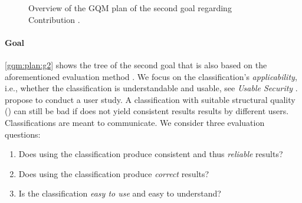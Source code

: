 \newcommand{\textGii}[0]{Validate the classification's \emph{applicability}, whether it is understandable, usable, and yields consistent results when employed by different users.}
\newcommand{\textGiiQi}[0]{Does using the classification produce consistent and thus \emph{reliable} results?}
\newcommand{\textGiiQii}[0]{Does using the classification produce \emph{correct} results?}
\newcommand{\textGiiQiii}[0]{Is the classification \emph{easy to use} and easy to understand?}
\newcommand{\textGiiQiMi}[0]{Relative size of the largest annotator $\emph{consensus} \in [0,1]$}
\newcommand{\textGiiQiiMi}[0]{Correctness of annotators' results, $\recallFormulaFull$}
\newcommand{\textGiiQiiiMi}[0]{\acf{SUS} $\in [0,100]$}
\begin{figure}
    \centering
    \caption{Overview of the \ac*{GQM} plan of the second goal regarding Contribution .}
    \label{gqm:plan:g2}
\end{figure}

\paragraph{Goal }\label{gqm:text:g:2}
\autoref{gqm:plan:g2} shows the tree of the second goal that is also based on the aforementioned evaluation method \cite{kaplan_introducing_2022}.
We focus on the classification's \emph{applicability}, i.e., whether the classification is understandable and usable, see \emph{Usable Security} \cite{sasse_usable_2005}.
\textcite{kaplan_introducing_2022} propose to conduct a user study.
A classification with suitable structural quality () can still be bad if does not yield consistent results results by different users.
Classifications are meant to communicate.
We consider three evaluation questions:

\begin{enumerate}[leftmargin=\GQMquestionsIndent]
  \item[\question{2}{1}] \textGiiQi 
  \item[\question{2}{2}] \textGiiQii
  \item[\question{2}{3}] \textGiiQiii
\end{enumerate}

